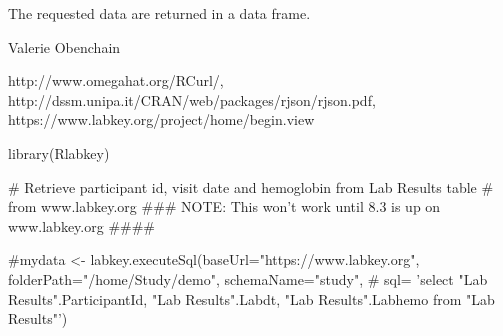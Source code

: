 \documentclass{article}
\begin{document}
\begin{Value}
The requested data are returned in a data frame.
\end{Value}
\begin{Author}\relax
Valerie Obenchain
\end{Author}
\begin{References}\relax
http://www.omegahat.org/RCurl/, 
http://dssm.unipa.it/CRAN/web/packages/rjson/rjson.pdf,
https://www.labkey.org/project/home/begin.view
\end{References}
\begin{SeeAlso}\relax
{}
\end{SeeAlso}
\begin{Examples}
\begin{ExampleCode}

library(Rlabkey)

# Retrieve participant id, visit date and hemoglobin from Lab Results table
# from www.labkey.org
### NOTE: This won't work until 8.3 is up on www.labkey.org ####

#mydata <- labkey.executeSql(baseUrl="https://www.labkey.org", folderPath="/home/Study/demo", schemaName="study", 
#                               sql= 'select "Lab Results".ParticipantId, "Lab Results".Labdt, "Lab Results".Labhemo from "Lab Results"')

\end{ExampleCode}
\end{Examples}
\end{document}
